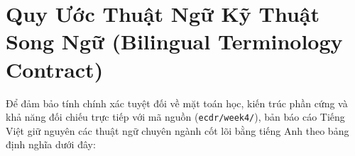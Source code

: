 \documentclass[11pt,a4paper]{article}
\newcommand{\code}[1]{{\small\ttfamily\nolinkurl{#1}}}
\theoremstyle{remark}
\begin{document}
\begingroup\small\setlength{\parskip}{1pt}\tableofcontents\endgroup
\clearpage

\section*{Quy Ước Thuật Ngữ Kỹ Thuật Song Ngữ (Bilingual Terminology Contract)}

Để đảm bảo tính chính xác tuyệt đối về mặt toán học, kiến trúc phần cứng và khả năng đối chiếu trực tiếp với mã nguồn (\code{ecdr/week4/}), bản báo cáo Tiếng Việt giữ nguyên các thuật ngữ chuyên ngành cốt lõi bằng tiếng Anh theo bảng định nghĩa dưới đây:
\end{document}
